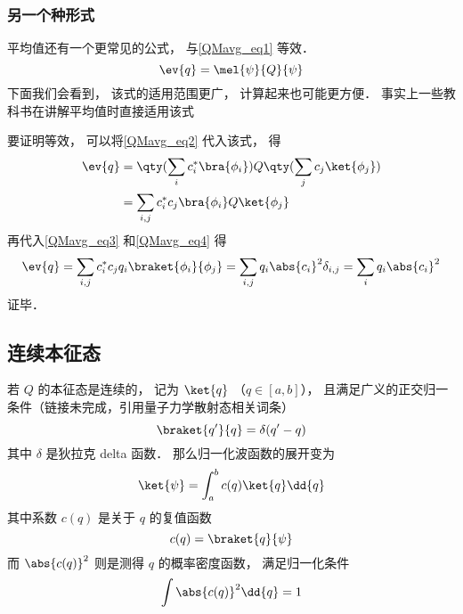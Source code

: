\subsubsection{另一个种形式}
平均值还有一个更常见的公式， 与\autoref{QMavg_eq1} 等效．
\begin{equation}\label{QMavg_eq5}
\ev{q} = \mel{\psi}{Q}{\psi}
\end{equation}
下面我们会看到， 该式的适用范围更广， 计算起来也可能更方便． 事实上一些教科书在讲解平均值时直接适用该式

要证明等效， 可以将\autoref{QMavg_eq2} 代入该式， 得
\begin{equation}
\begin{aligned}
\ev{q} &= \qty(\sum_i c_i^* \bra{\phi_i}) Q \qty(\sum_j c_j \ket{\phi_j})\\
&= \sum_{i,j} c_i^* c_j \bra{\phi_i} Q \ket{\phi_j}
\end{aligned} 
\end{equation}
再代入\autoref{QMavg_eq3} 和\autoref{QMavg_eq4} 得
\begin{equation}
\ev{q} = \sum_{i,j} c_i^* c_j q_i \braket{\phi_i}{\phi_j}
= \sum_{i,j} q_i \abs{c_i}^2 \delta_{i,j} = \sum_i q_i \abs{c_i}^2
\end{equation}
证毕．

\subsection{连续本征态}

若 $Q$ 的本征态是连续的， 记为 $\ket{q}$ （$q\in [a,b]$）， 且满足广义的正交归一条件（链接未完成，引用量子力学散射态相关词条）
\begin{equation}\label{QMavg_eq9}
\braket{q'}{q} = \delta(q'-q)
\end{equation}
其中 $\delta$ 是狄拉克 delta 函数． 那么归一化波函数的展开变为
\begin{equation}\label{QMavg_eq7}
\ket{\psi} = \int_a^b c(q) \ket{q} \dd{q}
\end{equation}
其中系数 $c(q)$ 是关于 $q$ 的复值函数
\begin{equation}\label{QMavg_eq10}
c(q) = \braket{q}{\psi}
\end{equation}
而 $\abs{c(q)}^2$ 则是测得 $q$ 的概率密度函数， 满足归一化条件
\begin{equation}
\int \abs{c(q)}^2 \dd{q} = 1
\end{equation}

